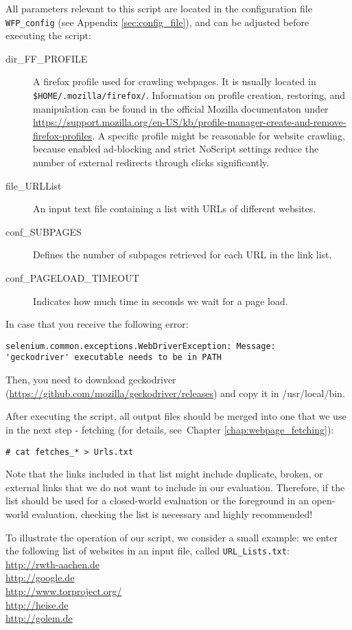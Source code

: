 All parameters relevant to this script are located in the configuration file \texttt{WFP\_config} (see Appendix \ref{sec:config_file}), and can be adjusted before executing the script:
\begin{description}
\item [dir\_FF\_PROFILE] A firefox profile used for crawling webpages. It is usually located in \texttt{\$HOME/.mozilla/firefox/}. Information on profile creation, restoring, and manipulation can be found in the official Mozilla documentaton under \url{https://support.mozilla.org/en-US/kb/profile-manager-create-and-remove-firefox-profiles}. A specific profile might be reasonable for website crawling, because enabled ad-blocking and strict NoScript settings reduce the number of external redirects through clicks significantly.
\item [file\_URLList] An input text file containing a list with \ac{URL}s of different websites.
\item [conf\_SUBPAGES] Defines the number of subpages retrieved for each \ac{URL} in the link list.
\item [conf\_PAGELOAD\_TIMEOUT] Indicates how much time in seconds we wait for a page load.
\end{description}

In case that you receive the following error:
\vspace{-2mm}
\begin{verbatim}
selenium.common.exceptions.WebDriverException: Message: 
'geckodriver' executable needs to be in PATH
\end{verbatim}
\vspace{-2mm}
Then, you need to download geckodriver (\url{https://github.com/mozilla/geckodriver/releases}) and copy it in /usr/local/bin.

After executing the script, all output files should be merged into one that we use in the next step - fetching (for details, see~Chapter \ref{chap:webpage_fetching}):
\begin{verbatim}
# cat fetches_* > Urls.txt
\end{verbatim}
Note that the links included in that list might include duplicate, broken, or external links that we do not want to include in our evaluation. Therefore, if the list should be used for a closed-world evaluation or the foreground in an open-world evaluation, checking the list is necessary and highly recommended! 

To illustrate the operation of our script, we consider a small example: we enter the following list of websites in an input file, called \texttt{URL\_Lists.txt}:\\[1mm]
\url{http://rwth-aachen.de}\\
\url{http://google.de}\\
\url{http://www.torproject.org/}\\
\url{http://heise.de}\\
\url{http://golem.de}

